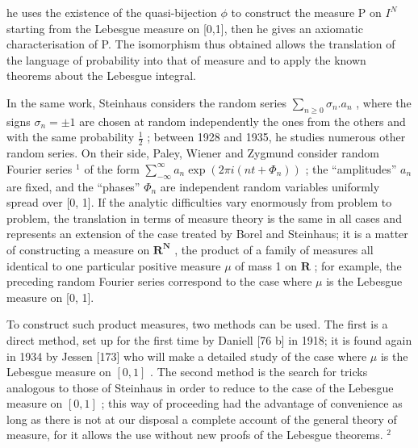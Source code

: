 he uses the existence of the quasi-bijection \(\phi\) to construct the measure P on \(I^{N}\) starting from the Lebesgue measure on [0,1], then he gives an axiomatic characterisation of P. The isomorphism thus obtained allows the translation of the language of probability into that of measure and to apply the known theorems about the Lebesgue integral.

In the same work, Steinhaus considers the random series \(\sum_{n\geq 0}\sigma_n.a_n\) , where the signs \(\sigma_{n} = \pm 1\) are chosen at random independently the ones from the others and with the same probability \(\frac{1}{2}\) ; between 1928 and 1935, he studies numerous other random series. On their side, Paley, Wiener and Zygmund consider random Fourier series \(^{1}\) of the form \(\sum_{-\infty}^{\infty}a_n\exp (2\pi i(nt + \varPhi_n))\) ; the ``amplitudes'' \(a_{n}\) are fixed, and the ``phases'' \(\varPhi_{n}\) are independent random variables uniformly spread over [0, 1]. If the analytic difficulties vary enormously from problem to problem, the translation in terms of measure theory is the same in all cases and represents an extension of the case treated by Borel and Steinhaus; it is a matter of constructing a measure on \(\mathbf{R}^{\mathbf{N}}\) , the product of a family of measures all identical to one particular positive measure \(\mu\) of mass 1 on \(\mathbf{R}\) ; for example, the preceding random Fourier series correspond to the case where \(\mu\) is the Lebesgue measure on [0, 1].

To construct such product measures, two methods can be used. The first is a direct method, set up for the first time by Daniell {[}76 b{]} in 1918; it is found again in 1934 by Jessen {[}173{]} who will make a detailed study of the case where \(\mu\) is the Lebesgue measure on \([0,1]\) . The second method is the search for tricks analogous to those of Steinhaus in order to reduce to the case of the Lebesgue measure on \([0,1]\) ; this way of proceeding had the advantage of convenience as long as there is not at our disposal a complete account of the general theory of measure, for it allows the use without new proofs of the Lebesgue theorems. \(^{2}\)

